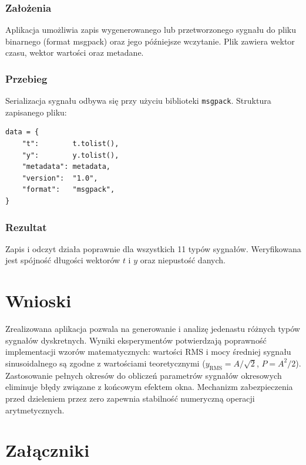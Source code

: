 \documentclass[12pt]{article}
\begin{document}
\subsubsection{Założenia}

Aplikacja umożliwia zapis wygenerowanego lub przetworzonego sygnału
do pliku binarnego (format msgpack) oraz jego późniejsze wczytanie.
Plik zawiera wektor czasu, wektor wartości oraz metadane.

\subsubsection{Przebieg}

Serializacja sygnału odbywa się przy użyciu biblioteki
\texttt{msgpack}. Struktura zapisanego pliku:

\begin{lstlisting}
data = {
    "t":        t.tolist(),
    "y":        y.tolist(),
    "metadata": metadata,
    "version":  "1.0",
    "format":   "msgpack",
}
\end{lstlisting}

\subsubsection{Rezultat}

Zapis i odczyt działa poprawnie dla wszystkich 11 typów
sygnałów. Weryfikowana jest spójność długości wektorów
$t$ i $y$ oraz niepustość danych.

\section{Wnioski}

Zrealizowana aplikacja pozwala na generowanie i analizę jedenastu
różnych typów sygnałów dyskretnych. Wyniki eksperymentów
potwierdzają poprawność implementacji wzorów matematycznych:
wartości RMS i mocy średniej sygnału sinusoidalnego są zgodne
z wartościami teoretycznymi ($y_{\mathrm{RMS}} = A/\sqrt{2}$,
$P = A^2/2$). Zastosowanie pełnych okresów do obliczeń parametrów
sygnałów okresowych eliminuje błędy związane z końcowym
efektem okna. Mechanizm zabezpieczenia przed dzieleniem przez zero zapewnia
stabilność numeryczną operacji arytmetycznych.

\section{Załączniki}
\end{document}
